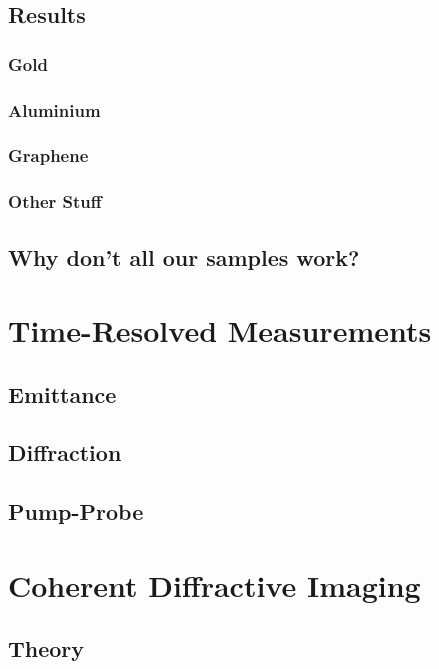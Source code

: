 \section{Results}

\subsection{Gold}

\subsection{Aluminium}

\subsection{Graphene}

\subsection{Other Stuff}

\section{Why don't all our samples work?}



\chapter{Time-Resolved Measurements}

\section{Emittance}

\section{Diffraction}

\section{Pump-Probe}


\chapter{Coherent Diffractive Imaging}

\section{Theory}

